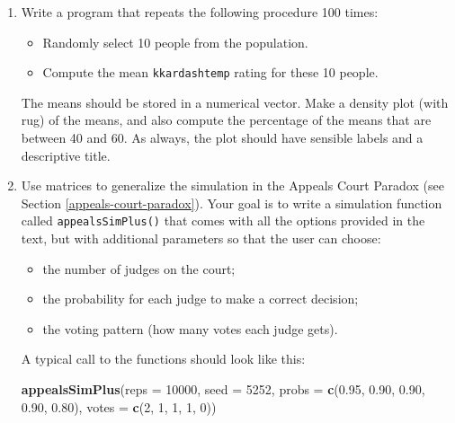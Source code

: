 \documentclass[]{book}
\makeatletter
\newenvironment{Shaded}{\begin{snugshade}}{\end{snugshade}}
\newcommand{\KeywordTok}[1]{\textcolor[rgb]{0.13,0.29,0.53}{\textbf{#1}}}
\newcommand{\DataTypeTok}[1]{\textcolor[rgb]{0.13,0.29,0.53}{#1}}
\newcommand{\DecValTok}[1]{\textcolor[rgb]{0.00,0.00,0.81}{#1}}
\newcommand{\FloatTok}[1]{\textcolor[rgb]{0.00,0.00,0.81}{#1}}
\newcommand{\NormalTok}[1]{#1}
\providecommand{\tightlist}{%
  \setlength{\itemsep}{0pt}\setlength{\parskip}{0pt}}
\newenvironment{kframe}{%
\medskip{}
\setlength{\fboxsep}{.8em}
 \def\at@end@of@kframe{}%
 \ifinner\ifhmode%
  \def\at@end@of@kframe{\end{minipage}}%
  \begin{minipage}{\columnwidth}%
 \fi\fi%
 \def\FrameCommand##1{\hskip\@totalleftmargin \hskip-\fboxsep
 \colorbox{shadecolor}{##1}\hskip-\fboxsep
     \hskip-\linewidth \hskip-\@totalleftmargin \hskip\columnwidth}%
 \MakeFramed {\advance\hsize-\width
   \@totalleftmargin\z@ \linewidth\hsize
   \@setminipage}}%
 {\par\unskip\endMakeFramed%
 \at@end@of@kframe}
\renewenvironment{Shaded}{\begin{kframe}}{\end{kframe}}
\theoremstyle{definition}
\theoremstyle{definition}
\theoremstyle{definition}
\theoremstyle{remark}
\makeatother
\begin{document}
{\begin{enumerate}
  One of the variables in \texttt{imagpop} is \texttt{kkardashtemp}, the
  rating given by each person to the celebrity Kim Kardashian. Make a
  density plot of the ratings. Compute the mean Kim Kardashian raintg
  for all the people in \texttt{imagpop}. Finally, compute the
  percentage of people in the population who gave a rating more than 40
  but less than 60.
\item
  Write a program that repeats the following procedure 100 times:

  \begin{itemize}
  \tightlist
  \item
    Randomly select 10 people from the population.
  \item
    Compute the mean \texttt{kkardashtemp} rating for these 10 people.
  \end{itemize}

  The means should be stored in a numerical vector. Make a density plot
  (with rug) of the means, and also compute the percentage of the means
  that are between 40 and 60. As always, the plot should have sensible
  labels and a descriptive title.
\item
  Use matrices to generalize the simulation in the Appeals Court Paradox
  (see Section \ref{appeals-court-paradox}). Your goal is to write a
  simulation function called \texttt{appealsSimPlus()} that comes with
  all the options provided in the text, but with additional parameters
  so that the user can choose:

  \begin{itemize}
  \tightlist
  \item
    the number of judges on the court;
  \item
    the probability for each judge to make a correct decision;
  \item
    the voting pattern (how many votes each judge gets).
  \end{itemize}

  A typical call to the functions should look like this:

\begin{Shaded}
\begin{Highlighting}[]
\KeywordTok{appealsSimPlus}\NormalTok{(}\DataTypeTok{reps =} \DecValTok{10000}\NormalTok{, }\DataTypeTok{seed =} \DecValTok{5252}\NormalTok{, }
               \DataTypeTok{probs =} \KeywordTok{c}\NormalTok{(}\FloatTok{0.95}\NormalTok{, }\FloatTok{0.90}\NormalTok{, }\FloatTok{0.90}\NormalTok{, }\FloatTok{0.90}\NormalTok{, }\FloatTok{0.80}\NormalTok{),}
               \DataTypeTok{votes =} \KeywordTok{c}\NormalTok{(}\DecValTok{2}\NormalTok{, }\DecValTok{1}\NormalTok{, }\DecValTok{1}\NormalTok{, }\DecValTok{1}\NormalTok{, }\DecValTok{0}\NormalTok{))}
\end{Highlighting}
\end{Shaded}


\end{enumerate}}
\end{document}
